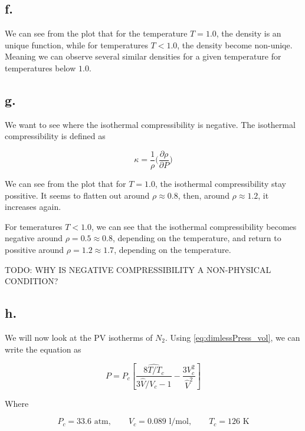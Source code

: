 \documentclass{article}
\begin{document}
\subsection*{f.}

  We can see from the plot that for the temperature $T = 1.0$, the density is an unique function, while for temperatures $T<1.0$, the density become non-uniqe. Meaning we can observe several similar densities for a given temperature for temperatures below $1.0$.

\subsection*{g.}

  We want to see where the isothermal compressibility is negative. The isothermal compressibility is defined as

\begin{equation}
\kappa = \frac{1}{\rho}\bigg(\frac{\partial\rho}{\partial P}\bigg)
\end{equation}

  We can see from the plot that for $T = 1.0$, the isothermal compressibility stay possitive. It seems to flatten out around $\rho \approx 0.8$, then, around $\rho \approx 1.2$, it increases again.

  For temeratures $T < 1.0$, we can see that the isothermal compressibility becomes negative around $\rho = 0.5 \approx 0.8$, depending on the temperature, and return to possitive around $\rho = 1.2 \approx 1.7$, depending on the temperature.

TODO: WHY IS NEGATIVE COMPRESSIBILITY A NON-PHYSICAL CONDITION?


\subsection*{h.}

We will now look at the PV isotherms of $N_2$. Using \eqref{eq:dimlessPress_vol}, we can write the equation as

\begin{equation}
P = P_c\left[\frac{\hat{8T/T_c}}{3\hat{V}/V_c - 1} - \frac{3V_c^2}{\hat{V}^2}\right]
\end{equation}

Where

\begin{equation}
P_c = 33.6 \text{ atm}, \qquad V_c = 0.089 \text{ l/mol}, \qquad T_c = 126 \text{ K}
\end{equation}
\end{document}

